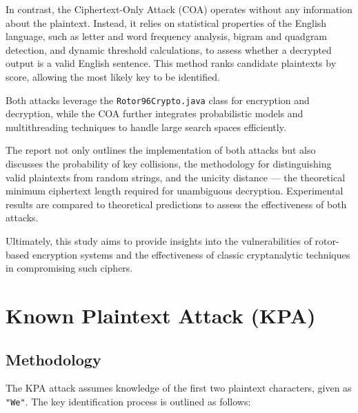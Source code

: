 \documentclass{article}
\begin{document}
In contrast, the Ciphertext-Only Attack (COA) operates without any information about the plaintext. Instead, it relies on statistical properties of the English language, such as letter and word frequency analysis, bigram and quadgram detection, and dynamic threshold calculations, to assess whether a decrypted output is a valid English sentence. This method ranks candidate plaintexts by score, allowing the most likely key to be identified.

Both attacks leverage the \texttt{Rotor96Crypto.java} class for encryption and decryption, while the COA further integrates probabilistic models and multithreading techniques to handle large search spaces efficiently. 

The report not only outlines the implementation of both attacks but also discusses the probability of key collisions, the methodology for distinguishing valid plaintexts from random strings, and the unicity distance — the theoretical minimum ciphertext length required for unambiguous decryption. Experimental results are compared to theoretical predictions to assess the effectiveness of both attacks.

Ultimately, this study aims to provide insights into the vulnerabilities of rotor-based encryption systems and the effectiveness of classic cryptanalytic techniques in compromising such ciphers.


\section{Known Plaintext Attack (KPA)}

\subsection{Methodology}
The KPA attack assumes knowledge of the first two plaintext characters, given as \texttt{"We"}. The key identification process is outlined as follows:
\end{document}
